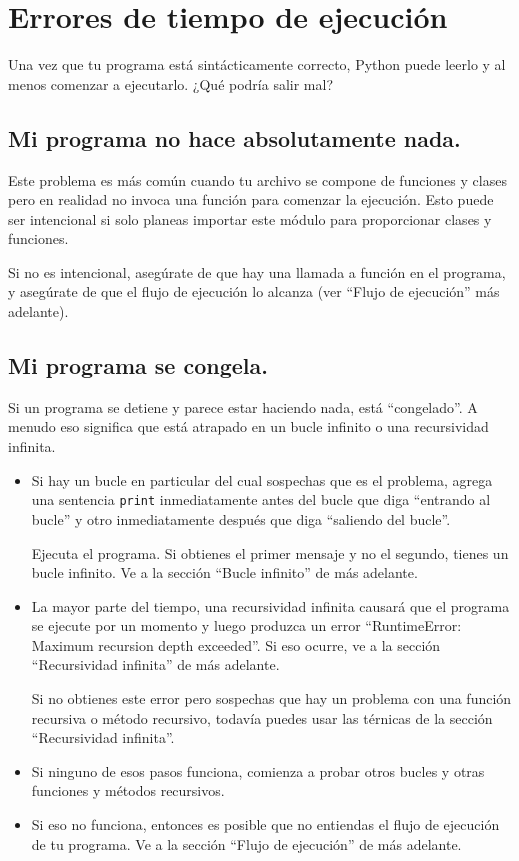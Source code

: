 \documentclass[10pt]{book}
\begin{document}
\section{Errores de tiempo de ejecución}

Una vez que tu programa está sintácticamente correcto,
Python puede leerlo y al menos comenzar a ejecutarlo.  ¿Qué podría
salir mal?


\subsection{Mi programa no hace absolutamente nada.}

Este problema es más común cuando tu archivo se compone de funciones y
clases pero en realidad no invoca una función para comenzar la ejecución.
Esto puede ser intencional si solo planeas importar este módulo para
proporcionar clases y funciones.

Si no es intencional, asegúrate de que hay una llamada a función
en el programa, y asegúrate de que el flujo de ejecución
lo alcanza (ver ``Flujo de ejecución'' más adelante).


\subsection{Mi programa se congela.}

Si un programa se detiene y parece estar haciendo nada, está ``congelado''.
A menudo eso significa que está atrapado en un bucle infinito o una
recursividad infinita.

\begin{itemize}

\item Si hay un bucle en particular del cual sospechas que es el
problema, agrega una sentencia {\tt print} inmediatamente antes del bucle que
diga ``entrando al bucle'' y otro inmediatamente después que diga
``saliendo del bucle''.

Ejecuta el programa.  Si obtienes el primer mensaje y no el segundo,
tienes un bucle infinito.  Ve a la sección ``Bucle infinito''
de más adelante.

\item La mayor parte del tiempo, una recursividad infinita causará que el
programa se ejecute por un momento y luego produzca un error ``RuntimeError: Maximum
recursion depth exceeded''.  Si eso ocurre, ve a la sección
``Recursividad infinita'' de más adelante.

Si no obtienes este error pero sospechas que hay un problema
con una función recursiva o método recursivo, todavía puedes usar las térnicas
de la sección ``Recursividad infinita''.

\item Si ninguno de esos pasos funciona, comienza a probar otros
bucles y otras funciones y métodos recursivos.

\item Si eso no funciona, entonces es posible que
no entiendas el flujo de ejecución de tu programa.
Ve a la sección ``Flujo de ejecución'' de más adelante.

\end{itemize}
\end{document}
